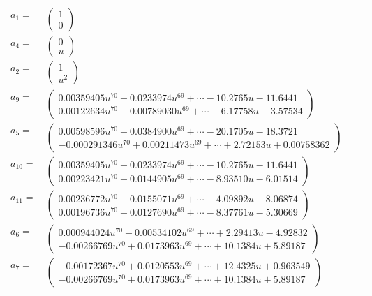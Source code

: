 \documentclass[1p]{elsarticle_modified}
\theoremstyle{definition}
\begin{document}
\begin{tabular}{m{7pt} m{180pt} m{7pt} m{180pt} }
\flushright $a_{1}=$&$\begin{pmatrix}1\\0\end{pmatrix}$ \\
\flushright $a_{4}=$&$\begin{pmatrix}0\\u\end{pmatrix}$ \\
\flushright $a_{2}=$&$\begin{pmatrix}1\\u^2\end{pmatrix}$ \\
\flushright $a_{9}=$&$\begin{pmatrix}0.00359405 u^{70}-0.0233974 u^{69}+\cdots-10.2765 u-11.6441\\0.00122634 u^{70}-0.00789030 u^{69}+\cdots-6.17758 u-3.57534\end{pmatrix}$ \\
\flushright $a_{5}=$&$\begin{pmatrix}0.00598596 u^{70}-0.0384900 u^{69}+\cdots-20.1705 u-18.3721\\-0.000291346 u^{70}+0.00211473 u^{69}+\cdots+2.72153 u+0.00758362\end{pmatrix}$ \\
\flushright $a_{10}=$&$\begin{pmatrix}0.00359405 u^{70}-0.0233974 u^{69}+\cdots-10.2765 u-11.6441\\0.00223421 u^{70}-0.0144905 u^{69}+\cdots-8.93510 u-6.01514\end{pmatrix}$ \\
\flushright $a_{11}=$&$\begin{pmatrix}0.00236772 u^{70}-0.0155071 u^{69}+\cdots-4.09892 u-8.06874\\0.00196736 u^{70}-0.0127690 u^{69}+\cdots-8.37761 u-5.30669\end{pmatrix}$ \\
\flushright $a_{6}=$&$\begin{pmatrix}0.000944024 u^{70}-0.00534102 u^{69}+\cdots+2.29413 u-4.92832\\-0.00266769 u^{70}+0.0173963 u^{69}+\cdots+10.1384 u+5.89187\end{pmatrix}$ \\
\flushright $a_{7}=$&$\begin{pmatrix}-0.00172367 u^{70}+0.0120553 u^{69}+\cdots+12.4325 u+0.963549\\-0.00266769 u^{70}+0.0173963 u^{69}+\cdots+10.1384 u+5.89187\end{pmatrix}$ \\

\end{tabular}
\end{document}
